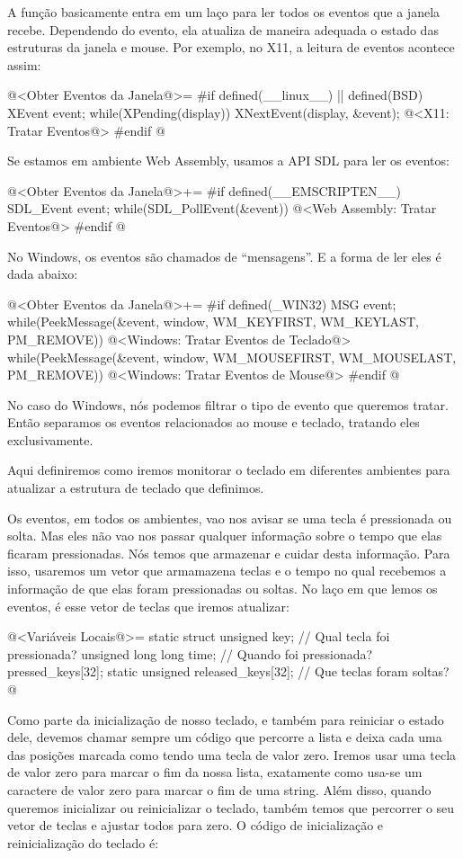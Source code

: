 A função basicamente entra em um laço para ler todos os eventos que a
janela recebe. Dependendo do evento, ela atualiza de maneira adequada
o estado das estruturas da janela e mouse. Por exemplo, no X11, a
leitura de eventos acontece assim:

\iniciocodigo
@<Obter Eventos da Janela@>=
#if defined(__linux__) || defined(BSD)
XEvent event;
while(XPending(display)){
  XNextEvent(display, &event);
  @<X11: Tratar Eventos@>
}
#endif
@
\fimcodigo

Se estamos em ambiente Web Assembly, usamos a API SDL para ler os
eventos:

\iniciocodigo
@<Obter Eventos da Janela@>+=
#if defined(__EMSCRIPTEN__)
SDL_Event event;
while(SDL_PollEvent(&event)){
  @<Web Assembly: Tratar Eventos@>
}
#endif
@
\fimcodigo

No Windows, os eventos são chamados de ``mensagens''. E a forma de ler
eles é dada abaixo:

\iniciocodigo
@<Obter Eventos da Janela@>+=
#if defined(_WIN32)
MSG event;
while(PeekMessage(&event, window, WM_KEYFIRST, WM_KEYLAST, PM_REMOVE)){
  @<Windows: Tratar Eventos de Teclado@>
}
while(PeekMessage(&event, window, WM_MOUSEFIRST, WM_MOUSELAST, PM_REMOVE)){
  @<Windows: Tratar Eventos de Mouse@>
}
#endif
@
\fimcodigo

No caso do Windows, nós podemos filtrar o tipo de evento que queremos
tratar. Então separamos os eventos relacionados ao mouse e teclado,
tratando eles exclusivamente.


Aqui definiremos como iremos monitorar o teclado em diferentes
ambientes para atualizar a estrutura de teclado que definimos.

Os eventos, em todos os ambientes, vao nos avisar se uma tecla é
pressionada ou solta. Mas eles não vao nos passar qualquer informação
sobre o tempo que elas ficaram pressionadas. Nós temos que armazenar e
cuidar desta informação. Para isso, usaremos um vetor que armamazena
teclas e o tempo no qual recebemos a informação de que elas foram
pressionadas ou soltas. No laço em que lemos os eventos, é esse vetor
de teclas que iremos atualizar:

\iniciocodigo
@<Variáveis Locais@>=
static struct{
  unsigned key; // Qual tecla foi pressionada?
  unsigned long long time;    // Quando foi pressionada?
} pressed_keys[32];
static unsigned released_keys[32]; // Que teclas foram soltas?
@
\fimcodigo

Como parte da inicialização de nosso teclado, e também para reiniciar
o estado dele, devemos chamar sempre um código que percorre a lista e
deixa cada uma das posições marcada como tendo uma tecla de valor
zero. Iremos usar uma tecla de valor zero para marcar o fim da nossa
lista, exatamente como usa-se um caractere de valor zero para marcar o
fim de uma string. Além disso, quando queremos inicializar ou
reinicializar o teclado, também temos que percorrer o seu vetor de
teclas e ajustar todos para zero. O código de inicialização e
reinicialização do teclado é:

